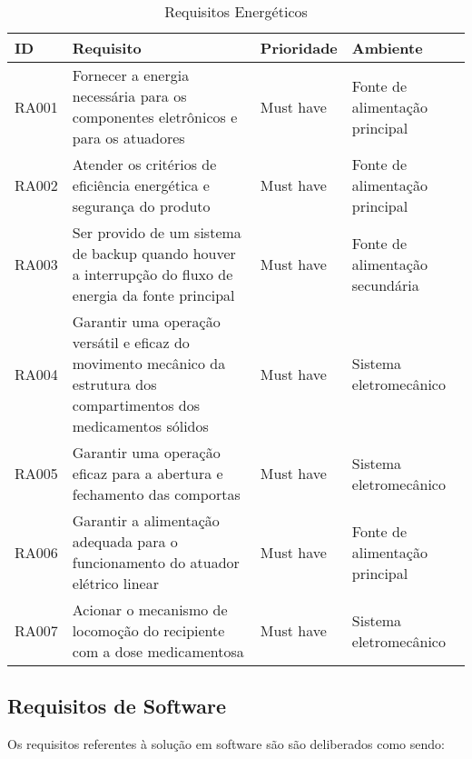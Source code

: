 \begin{table}[H]
    \centering
    \caption{Requisitos Energéticos}
    \begin{adjustbox}{max width = \textwidth}
        \begin{tabular}{|L{1.5cm}|L{8.5cm}|C{2.5cm}|C{3.5cm}|}
        \hline
        \textbf{ID} & \textbf{Requisito} & \textbf{Prioridade} & \textbf{Ambiente} \\
        \hline
        RA001 & Fornecer a energia necessária para os componentes eletrônicos e para os atuadores & Must have  & Fonte de alimentação principal \\ 
        \hline
        
        RA002 & Atender os critérios de eficiência energética e segurança do produto & Must have & Fonte de alimentação principal \\
        \hline
        
        RA003 & Ser provido de um sistema de backup quando houver a interrupção do fluxo de energia da fonte principal & Must have & Fonte de alimentação secundária \\ 
        \hline
        
        RA004 & Garantir uma operação versátil e eficaz do movimento mecânico da estrutura dos compartimentos dos medicamentos sólidos & Must have & Sistema eletromecânico\\ 
        \hline
        
        RA005 & Garantir uma operação eficaz para a abertura e fechamento das comportas & Must have & Sistema eletromecânico \\ 
        \hline
        
        RA006 & Garantir a alimentação adequada para o funcionamento do atuador elétrico linear& Must have & Fonte de alimentação principal \\ \hline
        
        RA007 & Acionar o mecanismo de locomoção do recipiente com a dose medicamentosa& Must have & Sistema eletromecânico\\ 
        \hline
        
        \end{tabular}
    \end{adjustbox}
\end{table}

\newpage
\subsection{Requisitos de Software}
Os requisitos referentes à solução em software são são deliberados como sendo:

